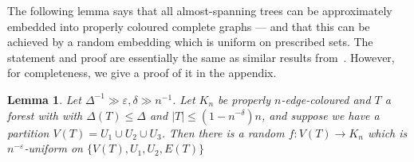 \documentclass[a4paper,11pt,hidelinks]{amsart}
\newtheorem{lemma}[theorem]{Lemma}
\theoremstyle{definition}
\newcommand{\AM}[1]{\textcolor{blue}{[#1]}}
\begin{document}
The following lemma says that all almost-spanning trees can be approximately embedded into properly coloured complete graphs --- and that this can be achieved by a random embedding which is uniform on prescribed sets. The statement and proof are essentially the same as similar results from~\cite{approximateringel, ringel}. However, for completeness, we give a proof of it in the appendix.
\begin{lemma}\label{Lemma_approximate_embedding}
 Let $\Delta^{-1}\gg \varepsilon,\delta \gg n^{-1}$.
Let $K_{n}$ be properly $n$-edge-coloured and  $T$ a  forest with with $\Delta(T)\leq \Delta$ and $|T|\leq (1-n^{-\delta})n$, and suppose we have a partition $V(T)=U_1\cup U_2\cup U_3$. 
Then there is a random  $f:V(T)\to K_n$ which is $n^{-\varepsilon}$-uniform on $\{V(T), U_1, U_2, E(T)\}$ %
\end{lemma}
\end{document}

